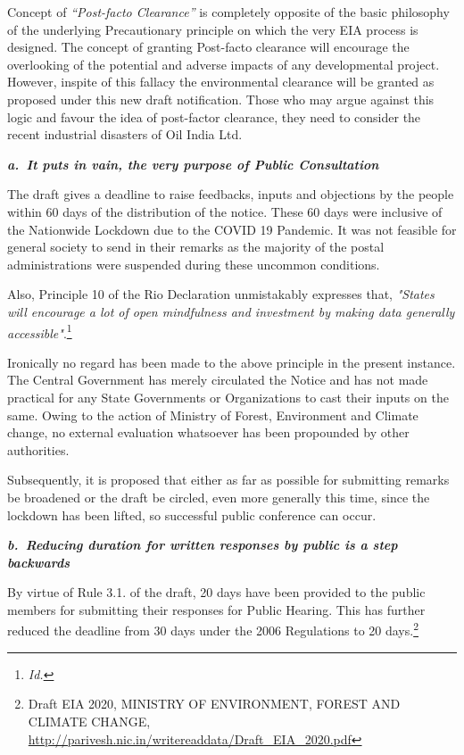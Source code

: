 \begin{multicols}{2}
\noi
Concept of \textit{“Post-facto Clearance”} is completely opposite of the basic philosophy of the
underlying Precautionary principle on which the very EIA process is designed. The concept
of granting Post-facto clearance will encourage the overlooking of the potential and adverse impacts of any developmental project. However, inspite of this fallacy the environmental
clearance will be granted as proposed under this new draft notification. Those who may argue
against this logic and favour the idea of post-factor clearance, they need to consider the recent
industrial disasters of Oil India Ltd.


\vspace{-.15cm}

\noi
{\large\it\bfseries a.~It puts in vain, the very purpose of Public Consultation}

\vspace{-.15cm}

\noi
The draft gives a deadline to raise feedbacks, inputs and objections by the people within 60
days of the distribution of the notice. These 60 days were inclusive of the Nationwide
Lockdown due to the COVID 19 Pandemic. It was not feasible for general society to send in
their remarks as the majority of the postal administrations were suspended during these
uncommon conditions.

\noi
Also, Principle 10 of the Rio Declaration unmistakably expresses that, \textit{"States will encourage
a lot of open mindfulness and investment by making data generally accessible"}.\footnote{\textit{Id.}}

\noi
Ironically no regard has been made to the above principle in the present instance. The Central
Government has merely circulated the Notice and has not made practical for any State
Governments or Organizations to cast their inputs on the same. Owing to the action of
Ministry of Forest, Environment and Climate change, no external evaluation whatsoever has
been propounded by other authorities.

\noi
Subsequently, it is proposed that either as far as possible for submitting remarks be
broadened or the draft be circled, even more generally this time, since the lockdown has been
lifted, so successful public conference can occur.  

\noi
{\large\it\bfseries b.~Reducing duration for written responses by public is a step backwards}

\noi
By virtue of Rule 3.1. of the draft, 20 days have been provided to the public members for
submitting their responses for Public Hearing. This has further reduced the deadline from 30
days under the 2006 Regulations to 20 days.\footnote{Draft EIA 2020, MINISTRY OF ENVIRONMENT, FOREST AND CLIMATE CHANGE,
\url{http://parivesh.nic.in/writereaddata/Draft_EIA_2020.pdf}}


\end{multicols}
